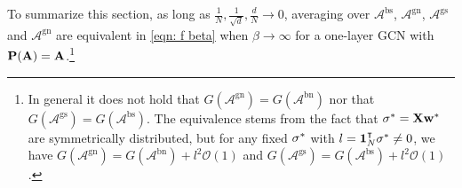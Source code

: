 \documentclass[9pt,twocolumn]{pnas-new}
\begin{document}
To summarize this section,  as long as $\frac{1}{N},\frac{1}{\sqrt{d}},  \frac{d}{N}\to 0$,  averaging over $\mathcal{A}^{\text{bs}}$, $\mathcal{A}^{\text{gn}}$, $\mathcal{A}^{\text{gs}}$ and $\mathcal{A}^{\text{gn}}$ are equivalent in \eqref{eqn: f beta} when $\beta \to \infty$ for a one-layer GCN with $\mathbf{P}(\mathbf{A})=\mathbf{A}$.\footnote{In general it does not hold that $G(\mathcal{A}^{\text{gn}})=G(\mathcal{A}^{\text{bn}})$ nor that $G(\mathcal{A}^{\text{gs}})=G(\mathcal{A}^{\text{bs}})$. The equivalence stems from the fact that $\mathbf{\sigma}^*=\mathbf{X}\mathbf{w}^*$ are symmetrically distributed, but for any fixed $\mathbf{\sigma}^*$ with $l=\boldsymbol{1}^\intercal_N \mathbf{\sigma}^* \neq0$, we have $G(\mathcal{A}^{\text{gn}})=G(\mathcal{A}^{\text{bn}})+l^2\mathcal{O}(1)$ and $G(\mathcal{A}^{\text{gs}})=G(\mathcal{A}^{\text{bs}})+l^2\mathcal{O}(1)$. }
\end{document}
